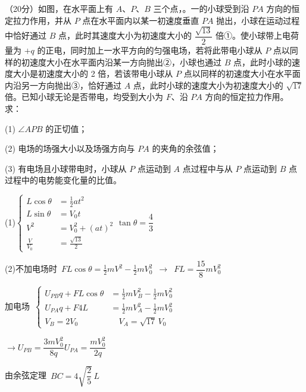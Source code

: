 \begin{problem}
（20分）如图，在水平面上有 $A$、$P$、$B$ 三个点，。一的小球受到沿 $PA$ 方向的恒定拉力作用，并从 $P$ 点在水平面内以某一初速度垂直 $PA$ 抛出，小球在运动过程中恰好通过 $B$ 点，此时其速度大小为初速度大小的 $\dfrac{\sqrt{13}}{2}$ 倍①。使小球带上电荷量为 $+q$ 的正电，同时加上一水平方向的匀强电场，若将此带电小球从 $P$ 点以同样的初速度大小在水平面内沿某一方向抛出②，小球也通过 $B$ 点，此时小球的速度大小是初速度大小的 2 倍，若该带电小球从 $P$ 点以同样的初速度大小在水平面内沿另一方向抛出③，恰好通过 $A$ 点，此时小球的速度大小为初速度大小的 $\sqrt{17}$ 倍。已知小球无论是否带电，均受到大小为 $F$、沿 $PA$ 方向的恒定拉力作用。求：

(1) $\angle APB$ 的正切值；

(2) 电场的场强大小以及场强方向与 $PA$ 的夹角的余弦值；

(3) 有电场且小球带电时，小球从 $P$ 点运动到 $A$ 点过程中与从 $P$ 点运动到 $B$ 点过程中的电势能变化量的比值。

\begin{solution}
(1)\quad $\left\{\begin{aligned} L\cos\theta&=\tfrac12at^2\\ L\sin\theta&=V_0t\\ V^2&=V_0^2+(at)^2\\ \tfrac{V}{V_0}&=\tfrac{\sqrt{13}}{2}\end{aligned}\right.$\qquad $\tan\theta=\dfrac43$

(2)\quad 不加电场时\ $FL\cos\theta=\tfrac12mV^2-\tfrac12mV_0^2$\ $\to$\ $FL=\dfrac{15}{8}mV_0^2$

加电场\ $\left\{\begin{aligned} U_{PB}q+FL\cos\theta&=\tfrac12mV_B^2-\tfrac12mV_0^2\\ U_{PA}q+F4L&=\tfrac12mV_A^2-\tfrac12mV_0^2\\ V_B=2V_0&\quad V_A=\sqrt{17}\,V_0\end{aligned}\right.$

$\to U_{PB}=\dfrac{3mV_0^2}{8q}$\qquad $U_{PA}=\dfrac{mV_0^2}{2q}$

由余弦定理\ $BC=4\sqrt{\dfrac25}\,L$

\end{solution}
\end{problem}

